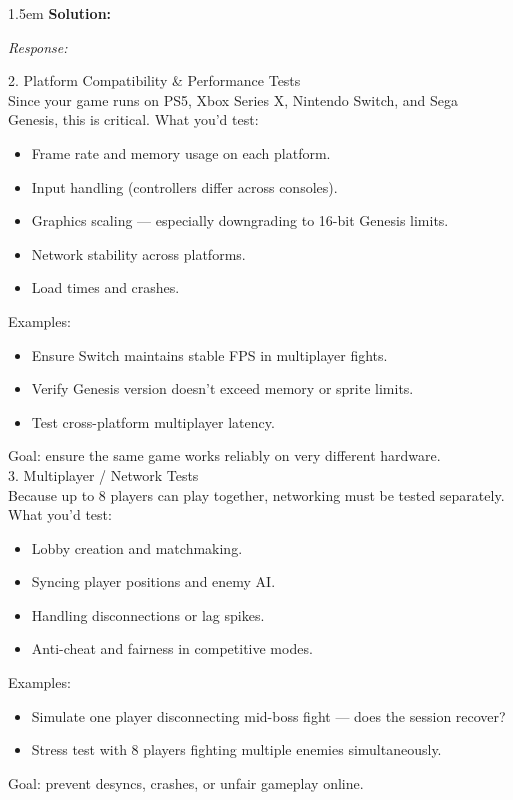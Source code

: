 \documentclass[10pt]{article}
\newenvironment{solution}{
	\vspace{.5em}
	\par
	\begin{adjustwidth}{1.5em}{}
	\textbf{{Solution:}}
	\par
	\vspace{.5em}
}{
	\vspace{1em}
	\end{adjustwidth}
}
\newenvironment{transcript}[1]{
	\vspace{.5em}
	\par
	\noindent
	\emph{#1:}
	\par
	\vspace{.5em}
}{
	\vspace{.5em}
}
\begin{document}
\begin{solution}
\begin{transcript}{Response}
		2. Platform Compatibility \& Performance Tests \\

		Since your game runs on PS5, Xbox Series X, Nintendo Switch, and Sega Genesis, this is critical. What you'd test: \\
		\begin{itemize}
			\item Frame rate and memory usage on each platform.
			\item Input handling (controllers differ across consoles).
			\item Graphics scaling --- especially downgrading to 16-bit Genesis limits.
			\item Network stability across platforms.
			\item Load times and crashes. \\
		\end{itemize}

		Examples: \\
		\begin{itemize}
			\item Ensure Switch maintains stable FPS in multiplayer fights.
			\item Verify Genesis version doesn't exceed memory or sprite limits.
			\item Test cross-platform multiplayer latency. \\
		\end{itemize}

		Goal: ensure the same game works reliably on very different hardware. \\

		3. Multiplayer / Network Tests \\

		Because up to 8 players can play together, networking must be tested separately. What you'd test: \\
		\begin{itemize}
			\item Lobby creation and matchmaking.
			\item Syncing player positions and enemy AI.
			\item Handling disconnections or lag spikes.
			\item Anti-cheat and fairness in competitive modes. \\
		\end{itemize}

		Examples: \\
		\begin{itemize}
			\item Simulate one player disconnecting mid-boss fight --- does the session recover?
			\item Stress test with 8 players fighting multiple enemies simultaneously. \\
		\end{itemize}

		Goal: prevent desyncs, crashes, or unfair gameplay online.
	\end{transcript}
\end{solution}
\end{document}
